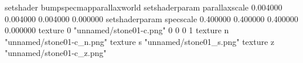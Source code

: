 setshader bumpspecmapparallaxworld
setshaderparam parallaxscale 0.004000 0.004000 0.004000 0.000000
setshaderparam specscale 0.400000 0.400000 0.400000 0.000000
texture 0 "unnamed/stone01-c.png" 0 0 0 1
texture n "unnamed/stone01-c_n.png"
texture s "unnamed/stone01_s.png"
texture z "unnamed/stone01-c_z.png"